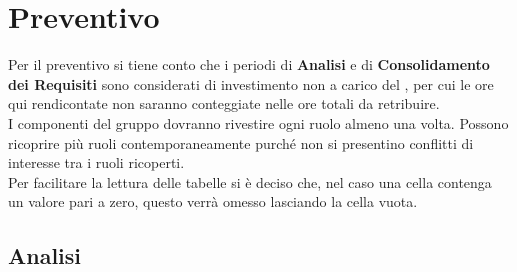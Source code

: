 \section{Preventivo}
Per il preventivo si tiene conto che i periodi di \textbf{Analisi} e di \textbf{Consolidamento dei Requisiti} sono considerati di investimento non a carico del , per cui le ore qui rendicontate non saranno conteggiate nelle ore totali da retribuire. \\
I componenti del gruppo dovranno rivestire ogni ruolo almeno una volta. Possono ricoprire più ruoli contemporaneamente purché non si presentino conflitti di interesse tra i ruoli ricoperti. \\
Per facilitare la lettura delle tabelle si è deciso che, nel caso una cella contenga un valore pari a zero, questo verrà omesso lasciando la cella vuota.
	\subsection{Analisi}
